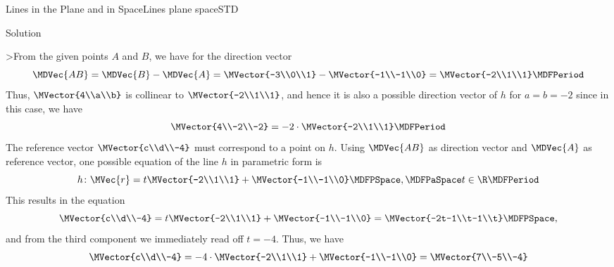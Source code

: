 \begin{MXContent}{Lines in the Plane and in Space}{Lines plane space}{STD}
\begin{MExercise}
\begin{MHint}{Solution}
 \begin{MExerciseItems}
\item{
>From the given points $A$ and $B$, we have for the direction vector
\[
 \MDVec{A B}=\MDVec{B}-\MDVec{A}=\MVector{-3\\0\\1}-\MVector{-1\\-1\\0}=\MVector{-2\\1\\1} \MDFPeriod
\]
Thus, $\MVector{4\\a\\b}$ is collinear to $\MVector{-2\\1\\1}$, and hence it is also a possible direction vector of 
$h$ for $a=b=-2$ since in this case, we have
\[
 \MVector{4\\-2\\-2} = -2\cdot\MVector{-2\\1\\1} \MDFPeriod
\]
The reference vector $\MVector{c\\d\\-4}$ must correspond to a point on $h$. Using $\MDVec{A B}$
as direction vector and $\MDVec{A}$ as reference vector, one possible equation of the line $h$ in parametric form
is
\[
 h\colon\MVec{r}=t\MVector{-2\\1\\1}+\MVector{-1\\-1\\0}\MDFPSpace,\MDFPaSpace t\in\R \MDFPeriod
\]
This results in the equation
\[
 \MVector{c\\d\\-4}=t\MVector{-2\\1\\1}+\MVector{-1\\-1\\0}=\MVector{-2t-1\\t-1\\t} \MDFPSpace ,
\]
and from the third component we immediately read off $t=-4$. Thus, we have
\[
 \MVector{c\\d\\-4}=-4\cdot\MVector{-2\\1\\1}+\MVector{-1\\-1\\0}=\MVector{7\\-5\\-4}
\]}
\end{MExerciseItems}
\end{MHint}
\end{MExercise}
\end{MXContent}
